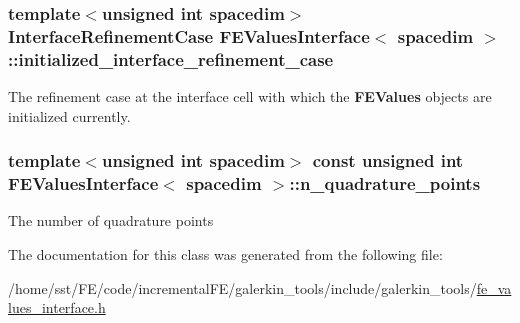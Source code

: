 \subsubsection[{\texorpdfstring{initialized\+\_\+interface\+\_\+refinement\+\_\+case}{initialized_interface_refinement_case}}]{\setlength{\rightskip}{0pt plus 5cm}template$<$unsigned int spacedim$>$ {\bf Interface\+Refinement\+Case} {\bf F\+E\+Values\+Interface}$<$ spacedim $>$\+::initialized\+\_\+interface\+\_\+refinement\+\_\+case\hspace{0.3cm}{\ttfamily [private]}}\hypertarget{class_f_e_values_interface_a4a14b4fa181df533a6c7e7971fad5c4e}{}\label{class_f_e_values_interface_a4a14b4fa181df533a6c7e7971fad5c4e}
The refinement case at the interface cell with which the {\bf F\+E\+Values} objects are initialized currently. 
\subsubsection[{\texorpdfstring{n\+\_\+quadrature\+\_\+points}{n_quadrature_points}}]{\setlength{\rightskip}{0pt plus 5cm}template$<$unsigned int spacedim$>$ const unsigned int {\bf F\+E\+Values\+Interface}$<$ spacedim $>$\+::n\+\_\+quadrature\+\_\+points}\hypertarget{class_f_e_values_interface_a100afc348b15432f9e241ff56ebffa8d}{}\label{class_f_e_values_interface_a100afc348b15432f9e241ff56ebffa8d}
The number of quadrature points 

The documentation for this class was generated from the following file\+:\begin{DoxyCompactItemize}
\item 
/home/sst/\+F\+E/code/incremental\+F\+E/galerkin\+\_\+tools/include/galerkin\+\_\+tools/\hyperlink{fe__values__interface_8h}{fe\+\_\+values\+\_\+interface.\+h}\end{DoxyCompactItemize}
